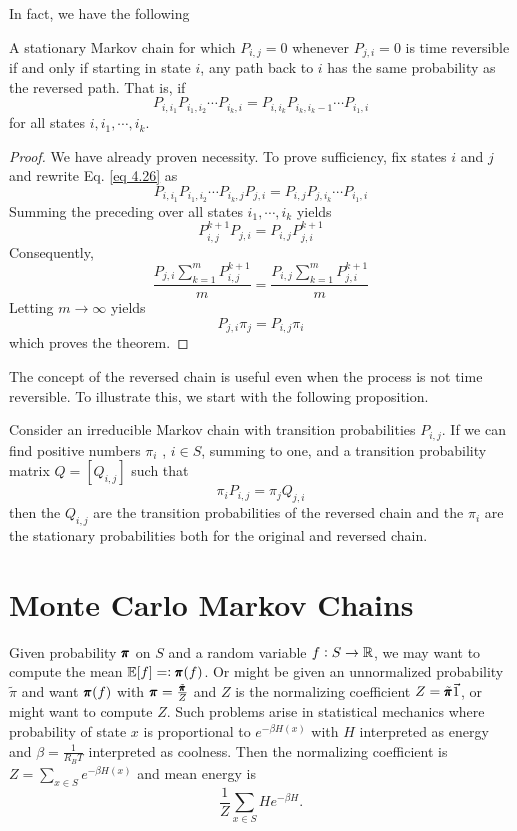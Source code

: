 In fact, we have the following

\begin{theorem}
    A stationary Markov chain for which $P_{i,j} = 0$ whenever $P_{j,i} = 0$ is time reversible if and only if starting in state $i$, any path back to $i$ has the same probability as the reversed path. That is, if
    \begin{equation}\label{eq 4.26}
        P_{i,i_1}P_{i_1,i_2}\cdots P_{i_k, i} = P_{i,i_k} P_{i_k, i_k-1} \cdots P_{i_1, i}
    \end{equation}
    for all states $i, i_1, \cdots, i_k$.
    \begin{proof}
        We have already proven necessity. To prove sufficiency, fix states $i$ and $j$ and
        rewrite Eq. \eqref{eq 4.26} as
        $$
        P_{i,i_1} P_{i_1 ,i_2} \cdots  P_{i_k ,j} P_{j,i} = P_{i,j} P_{j,i_k} \cdots P_{i_1 ,i}
        $$
        Summing the preceding over all states $i_1 , \cdots , i_k$ yields
        $$
        P_{i,j}^{k+1} P_{j,i} = P_{i,j} P_{j,i}^{k+1}
        $$
        Consequently,
        $$
        \frac{P_{j,i}\sum_{k = 1}^m P^{k+1}_{i,j}}{m} = \frac{P_{i,j}\sum_{k = 1}^m P^{k+1}_{j,i}}{m}
        $$
        Letting $m \to \infty$ yields
        $$P_{j,i} \pi_j = P_{i,j} \pi_i$$
        which proves the theorem.
    \end{proof}
\end{theorem}

The concept of the reversed chain is useful even when the process is not time reversible. To illustrate this, we start with the following proposition.
\begin{proposition}
    Consider an irreducible Markov chain with transition probabilities
    $P_{i,j}$. If we can find positive numbers $\pi_i$ , $i \in S$, summing to one, and a transition probability matrix $Q = [Q_{i,j}]$ such that
    \begin{equation}\label{eq 4.29}
        \pi_i P_{i,j} =\pi_j Q_{j,i}
    \end{equation}
    then the $Q_{i,j}$ are the transition probabilities of the reversed chain and the $\pi_i$ are the
    stationary probabilities both for the original and reversed chain.
\end{proposition}
    

\section{Monte Carlo Markov Chains}

Given probability $\pmb{\pi}$ on $S$ and a random variable $f: S \to \mathbb{R}$, we may want to compute the mean $\mathbb{E}[f]=:\pmb{\pi}(f)$. Or might be given an unnormalized probability $\tilde{\pi}$ and want $\pmb{\pi}(f)$ with $\pmb{\pi} = \frac{\tilde{\pmb{\pi}}}{Z}$ and $Z$ is the normalizing coefficient $Z = \tilde{\pmb{\pi}} \vec{1}$, or might want to compute $Z$. Such problems arise in statistical mechanics where probability of state $x$ is proportional to $e^{-\beta H(x)}$ with $H$ interpreted as energy and $\beta = \frac{1}{R_BT}$ interpreted as coolness. Then the normalizing coefficient is $Z = \sum_{x\in S} e^{-\beta H(x)}$ and mean energy is 
$$
\frac{1}{Z} \sum_{x \in S} H e^{-\beta H}.
$$

